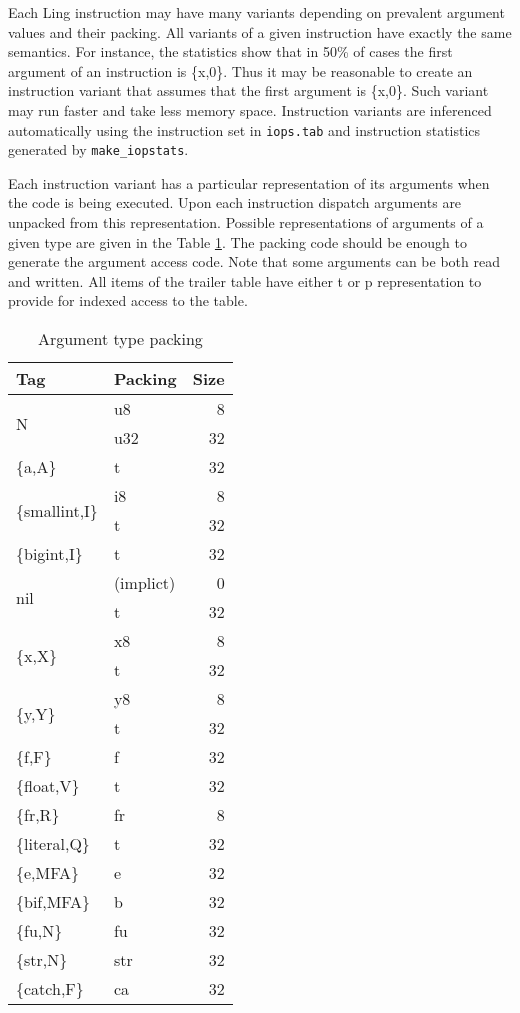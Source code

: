 \documentclass{article}
\begin{document}
Each Ling instruction may have many variants depending on prevalent argument
values and their packing. All variants of a given instruction have exactly the
same semantics. For instance, the statistics show that in 50\% of cases the
first argument of an instruction is \{x,0\}. Thus it may be reasonable to create
an instruction variant that assumes that the first argument is \{x,0\}. Such
variant may run faster and take less memory space. Instruction variants are
inferenced automatically using the instruction set in \texttt{iops.tab} and
instruction statistics generated by \texttt{make\_iopstats}.

Each instruction variant has a particular representation of its arguments when
the code is being executed.  Upon each instruction dispatch arguments are
unpacked from this representation. Possible representations of arguments of a
given type are given in the Table \ref{tab:typepack}. The packing code should be
enough to generate the argument access code. Note that some arguments can be
both read and written. All items of the trailer table have either t or p
representation to provide for indexed access to the table.

\begin{table}[!ht]
\begin{tabular}{llr}
Tag & Packing & Size \\
\hline
\multirow{2}{*}{N} & u8 & 8 \\
& u32 & 32 \\
\hline
\{a,A\} & t & 32 \\
\hline
\multirow{2}{*}{\{smallint,I\}} & i8 & 8 \\
& t & 32 \\
\hline
\{bigint,I\} & t & 32 \\
\hline
\multirow{2}{*}{nil} & (implict) & 0 \\
& t & 32 \\
\hline
\multirow{2}{*}{\{x,X\}} & x8 & 8 \\
& t & 32 \\
\hline
\multirow{2}{*}{\{y,Y\}} & y8 & 8 \\
& t & 32 \\
\hline
\{f,F\} & f & 32 \\
\{float,V\} & t & 32 \\
\{fr,R\} & fr & 8 \\
\{literal,Q\} & t & 32 \\
\{e,MFA\} & e & 32 \\
\{bif,MFA\} & b & 32 \\
\{fu,N\} & fu & 32 \\
\{str,N\} & str & 32 \\
\{catch,F\} & ca & 32 \\
\hline
\end{tabular}
\caption{Argument type packing\label{tab:typepack}}
\end{table}
\end{document}
